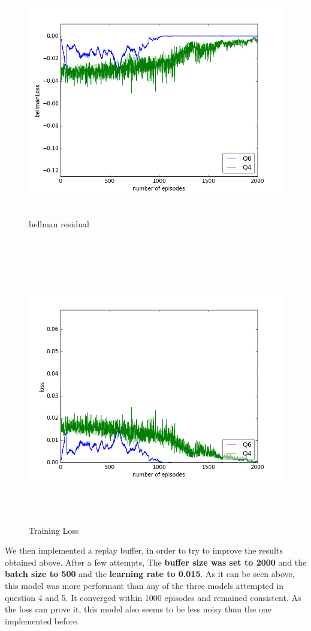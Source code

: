 \documentclass{report}
\begin{document}
\begin{figure}[H]
    \begin{minipage}[c]{.49\linewidth}
        \centering
        \includegraphics[width = \linewidth]{plots/a6/bellmanLoss.png}
        \caption{bellman residual}
    \end{minipage}
    \hfill%
    \begin{minipage}[c]{.49\linewidth}
        \centering
        \includegraphics[width = \linewidth]{plots/a6/loss.png}
        \caption{Training Loss}
    \end{minipage}
\end{figure}

We then implemented a replay buffer, in order to try to improve the results obtained above. After a few attempts, The \textbf{buffer size was set to 2000} and the \textbf{batch size to 500} and the \textbf{learning rate to 0.015}. As it can be seen above, this model was more performant than any of the three models attempted in question 4 and 5. It converged within 1000 episodes and remained consistent. As the loss can prove it, this model also seems to be less noisy than the one implemented before.
\end{document}
